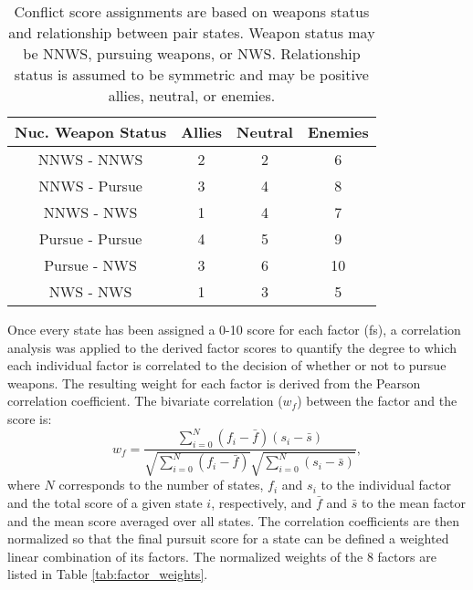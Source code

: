 \begin{table}
\centering
\begin{tabular}{|c||c|c|c|}
\hline
\textbf{Nuc. Weapon Status} & \textbf{Allies}  & \textbf{Neutral}  & \textbf{Enemies} \\
\hline
\hline
NNWS - NNWS     & 2 & 2 & 6 \\
\hline
NNWS - Pursue   & 3 & 4 & 8 \\
\hline
NNWS - NWS      & 1 & 4 & 7 \\
\hline
Pursue - Pursue & 4 & 5 & 9 \\
\hline
Pursue - NWS    & 3 & 6 & 10 \\
\hline
NWS - NWS       & 1 & 3 & 5 \\
\hline
\end{tabular}
\caption{Conflict score assignments are based on weapons status and relationship between pair states. Weapon status may be \gls{NNWS}, pursuing weapons, or \gls{NWS}. Relationship status is assumed to be symmetric and  may be positive allies, neutral, or enemies.}
\label{tab:conflict}
\end{table}

Once every state has been assigned a 0-10 score for each factor (fs), a correlation
analysis was applied to the derived factor scores to quantify the degree to
which each individual factor is correlated to the decision of whether or not to
pursue weapons. The resulting weight for each factor is derived from the Pearson correlation coefficient. The bivariate correlation ($w_{f}$) between the factor and the score is:
\begin{equation}
    \label{eqn:correlation}
    w_{f} = \frac{\sum_{i=0}^{N} (f_{i} - \bar{f}) (s_{i} - \bar{s})}
                 {\sqrt{\sum_{i=0}^{N}\left(f_{i} - \bar{f}\right)}
                 \sqrt{\sum_{i=0}^{N}\left(s_{i} - \bar{s}\right)}},
\end{equation}
where $N$ corresponds to the number of states, $f_{i}$ and $s_{i}$ to the individual factor and the total score of a given state $i$, respectively,  and $\bar{f}$ and $\bar{s}$ to the mean factor and the mean score averaged over all states.  The correlation coefficients are then normalized so that the final pursuit score for a state can be defined a weighted linear combination of its factors. The normalized weights of the 8 factors are listed in Table \ref{tab:factor_weights}. 

